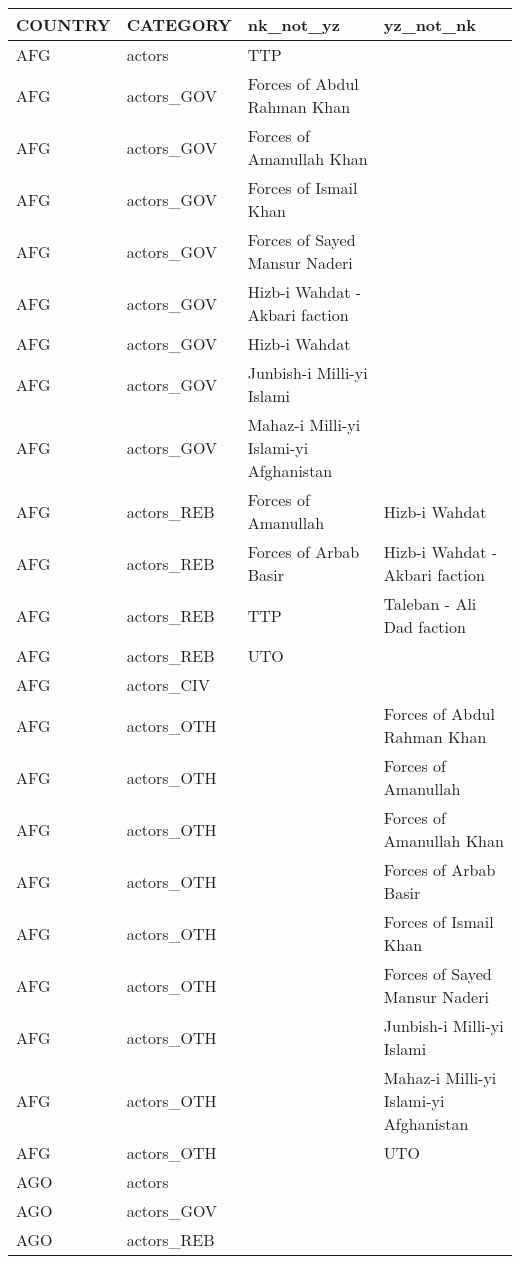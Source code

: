 
\begin{table}[ht]
\centering
\begin{tabular}{llll}
  \hline
COUNTRY & CATEGORY & nk\_not\_yz & yz\_not\_nk \\ 
  \hline
AFG & actors & TTP &  \\ 
  AFG & actors\_GOV & Forces of Abdul Rahman Khan &  \\ 
  AFG & actors\_GOV & Forces of Amanullah Khan &  \\ 
  AFG & actors\_GOV & Forces of Ismail Khan &  \\ 
  AFG & actors\_GOV & Forces of Sayed Mansur Naderi &  \\ 
  AFG & actors\_GOV & Hizb-i Wahdat - Akbari faction &  \\ 
  AFG & actors\_GOV & Hizb-i Wahdat &  \\ 
  AFG & actors\_GOV & Junbish-i Milli-yi Islami &  \\ 
  AFG & actors\_GOV & Mahaz-i Milli-yi Islami-yi Afghanistan &  \\ 
  AFG & actors\_REB & Forces of Amanullah & Hizb-i Wahdat \\ 
  AFG & actors\_REB & Forces of Arbab Basir & Hizb-i Wahdat - Akbari faction \\ 
  AFG & actors\_REB & TTP & Taleban - Ali Dad faction \\ 
  AFG & actors\_REB & UTO &  \\ 
  AFG & actors\_CIV &  &  \\ 
  AFG & actors\_OTH &  & Forces of Abdul Rahman Khan \\ 
  AFG & actors\_OTH &  & Forces of Amanullah \\ 
  AFG & actors\_OTH &  & Forces of Amanullah Khan \\ 
  AFG & actors\_OTH &  & Forces of Arbab Basir \\ 
  AFG & actors\_OTH &  & Forces of Ismail Khan \\ 
  AFG & actors\_OTH &  & Forces of Sayed Mansur Naderi \\ 
  AFG & actors\_OTH &  & Junbish-i Milli-yi Islami \\ 
  AFG & actors\_OTH &  & Mahaz-i Milli-yi Islami-yi Afghanistan \\ 
  AFG & actors\_OTH &  & UTO \\ 
  AGO & actors &  &  \\ 
  AGO & actors\_GOV &  &  \\ 
  AGO & actors\_REB &  &  \\ 

\end{tabular}
\end{table}
